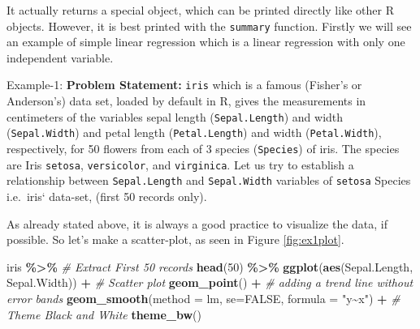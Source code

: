 \documentclass[
]{book}
\newenvironment{Shaded}{\begin{snugshade}}{\end{snugshade}}
\newcommand{\AttributeTok}[1]{\textcolor[rgb]{0.13,0.29,0.53}{#1}}
\newcommand{\CommentTok}[1]{\textcolor[rgb]{0.56,0.35,0.01}{\textit{#1}}}
\newcommand{\ConstantTok}[1]{\textcolor[rgb]{0.56,0.35,0.01}{#1}}
\newcommand{\DecValTok}[1]{\textcolor[rgb]{0.00,0.00,0.81}{#1}}
\newcommand{\FunctionTok}[1]{\textcolor[rgb]{0.13,0.29,0.53}{\textbf{#1}}}
\newcommand{\NormalTok}[1]{#1}
\newcommand{\SpecialCharTok}[1]{\textcolor[rgb]{0.81,0.36,0.00}{\textbf{#1}}}
\newcommand{\StringTok}[1]{\textcolor[rgb]{0.31,0.60,0.02}{#1}}
\begin{document}
It actually returns a special object, which can be printed directly like other R objects. However, it is best printed with the \texttt{summary} function. Firstly we will see an example of simple linear regression which is a linear regression with only one independent variable.

Example-1: \textbf{Problem Statement:} \texttt{iris} which is a famous (Fisher's or Anderson's) data set, loaded by default in R, gives the measurements in centimeters of the variables sepal length (\texttt{Sepal.Length}) and width (\texttt{Sepal.Width}) and petal length (\texttt{Petal.Length}) and width (\texttt{Petal.Width}), respectively, for 50 flowers from each of 3 species (\texttt{Species}) of iris. The species are Iris \texttt{setosa}, \texttt{versicolor}, and \texttt{virginica}. Let us try to establish a relationship between \texttt{Sepal.Length} and \texttt{Sepal.Width} variables of \texttt{setosa} Species i.e.~iris` data-set, (first 50 records only).

As already stated above, it is always a good practice to visualize the data, if possible. So let's make a scatter-plot, as seen in Figure \ref{fig:ex1plot}.

\begin{Shaded}
\begin{Highlighting}[]
\NormalTok{iris }\SpecialCharTok{\%\textgreater{}\%} 
  \CommentTok{\# Extract First 50 records}
  \FunctionTok{head}\NormalTok{(}\DecValTok{50}\NormalTok{) }\SpecialCharTok{\%\textgreater{}\%} 
  \FunctionTok{ggplot}\NormalTok{(}\FunctionTok{aes}\NormalTok{(Sepal.Length, Sepal.Width)) }\SpecialCharTok{+}
  \CommentTok{\# Scatter plot}
  \FunctionTok{geom\_point}\NormalTok{() }\SpecialCharTok{+}
  \CommentTok{\# adding a trend line without error bands}
  \FunctionTok{geom\_smooth}\NormalTok{(}\AttributeTok{method =} \StringTok{\textquotesingle{}lm\textquotesingle{}}\NormalTok{, }\AttributeTok{se=}\ConstantTok{FALSE}\NormalTok{, }\AttributeTok{formula =} \StringTok{"y\textasciitilde{}x"}\NormalTok{) }\SpecialCharTok{+}
  \CommentTok{\# Theme Black and White}
  \FunctionTok{theme\_bw}\NormalTok{()}
\end{Highlighting}
\end{Shaded}
\end{document}
